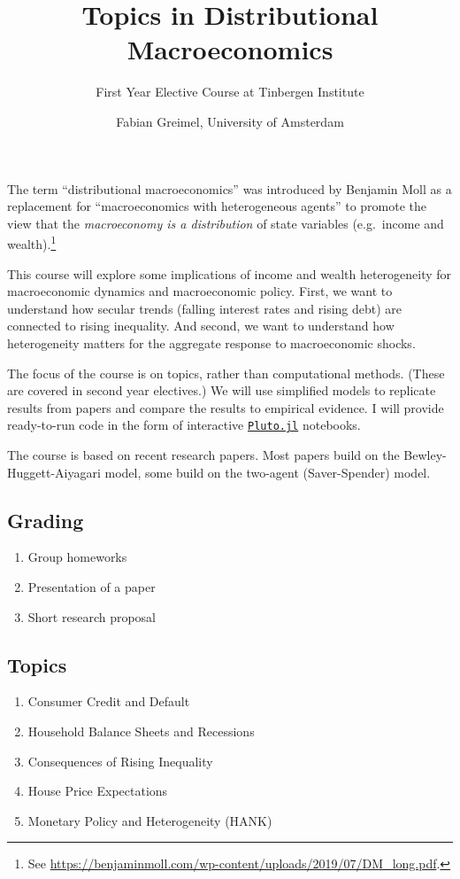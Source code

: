 \documentclass[a4paper,11pt]{article}
\title{Topics in Distributional Macroeconomics}
\date{\vspace{-2ex} Fabian Greimel, University of Amsterdam}
\author{First Year Elective Course at Tinbergen Institute}
\begin{document}
\maketitle

\noindent
The term ``distributional macroeconomics'' was introduced by Benjamin Moll as a replacement for ``macroeconomics with heterogeneous agents'' to promote the view that the \emph{macroeconomy is a distribution} of state variables (e.g.\ income and wealth).\footnote{See \url{ https://benjaminmoll.com/wp-content/uploads/2019/07/DM_long.pdf}.}

This course will explore some implications of income and wealth heterogeneity for macroeconomic dynamics and macroeconomic policy. First, we want to understand how secular trends (falling interest rates and rising debt) are connected to rising inequality. And second, we want to understand how heterogeneity matters for the aggregate response to macroeconomic shocks.

The focus of the course is on topics, rather than computational methods. (These are covered in second year electives.) We will use simplified models to replicate results from papers and compare the results to empirical evidence. I will provide ready-to-run code in the form of interactive \href{https://github.com/fonsp/Pluto.jl}{\texttt{Pluto.jl}} notebooks. 

The course is based on recent research papers. Most papers build on the Bewley-Huggett-Aiyagari model, some build on the two-agent (Saver-Spender) model. 

\subsection*{Grading}

\begin{enumerate}
\item Group homeworks
\item Presentation of a paper
\item Short research proposal
\end{enumerate}

\subsection*{Topics}

\begin{enumerate}
\item Consumer Credit and Default
\item Household Balance Sheets and Recessions
\item Consequences of Rising Inequality
\item House Price Expectations
\item Monetary Policy and Heterogeneity (HANK)
\end{enumerate}
\end{document}
